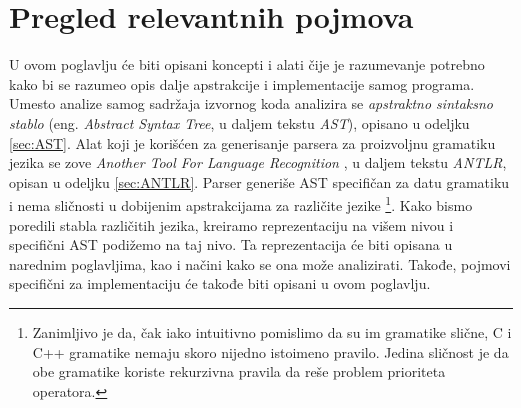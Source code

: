 \chapter{Pregled relevantnih pojmova}
\label{chp:RelevantTerms}

U ovom poglavlju će biti opisani koncepti i alati čije je razumevanje
potrebno kako bi se razumeo opis dalje apstrakcije i implementacije 
samog programa. Umesto analize samog sadržaja izvornog koda analizira
se \emph{apstraktno sintaksno stablo} (eng. \emph{Abstract Syntax Tree}, u 
daljem tekstu \emph{AST}), opisano u odeljku \ref{sec:AST}.
Alat koji je korišćen za generisanje parsera za proizvoljnu gramatiku jezika 
se zove \emph{Another Tool For Language Recognition} \cite{ANTLR}, 
u daljem tekstu \emph{ANTLR}, opisan u odeljku \ref{sec:ANTLR}.
Parser generiše AST specifičan za datu gramatiku i nema sličnosti u 
dobijenim apstrakcijama za različite jezike \footnote{Zanimljivo je da, 
čak iako intuitivno pomislimo da su im gramatike slične, C i C++ gramatike
nemaju skoro nijedno istoimeno pravilo. Jedina sličnost je da obe gramatike 
koriste rekurzivna pravila da reše problem prioriteta operatora.}.
Kako bismo poredili stabla različitih jezika, kreiramo reprezentaciju na 
višem nivou i specifični AST podižemo na taj nivo. Ta reprezentacija će
biti opisana u narednim poglavljima, kao i načini kako se ona može
analizirati. Takođe, pojmovi specifični za implementaciju će takođe biti
opisani u ovom poglavlju.




